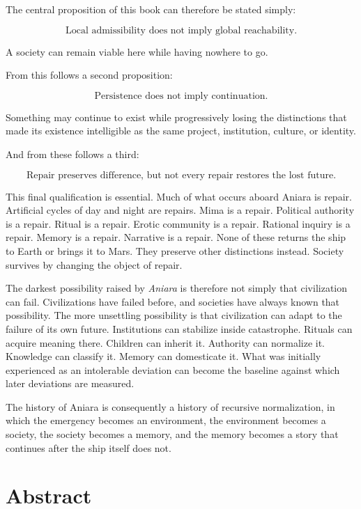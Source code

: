 \documentclass[11pt,oneside]{book}
\theoremstyle{definition}
\theoremstyle{remark}
\begin{document}
The central proposition of this book can therefore be stated simply:

\[
\boxed{
\text{Local admissibility does not imply global reachability.}
}
\]

A society can remain viable here while having nowhere to go.

From this follows a second proposition:

\[
\boxed{
\text{Persistence does not imply continuation.}
}
\]

Something may continue to exist while progressively losing the distinctions that made its existence intelligible as the same project, institution, culture, or identity.

And from these follows a third:

\[
\boxed{
\text{Repair preserves difference, but not every repair restores the lost future.}
}
\]

This final qualification is essential. Much of what occurs aboard Aniara is repair. Artificial cycles of day and night are repairs. Mima is a repair. Political authority is a repair. Ritual is a repair. Erotic community is a repair. Rational inquiry is a repair. Memory is a repair. Narrative is a repair. None of these returns the ship to Earth or brings it to Mars. They preserve other distinctions instead. Society survives by changing the object of repair.

The darkest possibility raised by \emph{Aniara} is therefore not simply that civilization can fail. Civilizations have failed before, and societies have always known that possibility. The more unsettling possibility is that civilization can adapt to the failure of its own future. Institutions can stabilize inside catastrophe. Rituals can acquire meaning there. Children can inherit it. Authority can normalize it. Knowledge can classify it. Memory can domesticate it. What was initially experienced as an intolerable deviation can become the baseline against which later deviations are measured.

The history of Aniara is consequently a history of recursive normalization, in which the emergency becomes an environment, the environment becomes a society, the society becomes a memory, and the memory becomes a story that continues after the ship itself does not.

\chapter*{Abstract}
\end{document}
